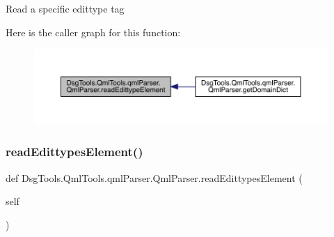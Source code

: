 \begin{DoxyVerb}Read a specific edittype tag
\end{DoxyVerb}
 Here is the caller graph for this function\+:
\nopagebreak
\begin{figure}[H]
\begin{center}
\leavevmode
\includegraphics[width=350pt]{class_dsg_tools_1_1_qml_tools_1_1qml_parser_1_1_qml_parser_a76b213f382b5af36a915fc319f6d24bc_icgraph}
\end{center}
\end{figure}
\mbox{\label{class_dsg_tools_1_1_qml_tools_1_1qml_parser_1_1_qml_parser_a711bc4f9cf1e4a41d115cf8d2713a2ee}} 
\subsubsection{\texorpdfstring{read\+Edittypes\+Element()}{readEdittypesElement()}}
{\footnotesize\ttfamily def Dsg\+Tools.\+Qml\+Tools.\+qml\+Parser.\+Qml\+Parser.\+read\+Edittypes\+Element (\begin{DoxyParamCaption}\item[{}]{self }\end{DoxyParamCaption})}

